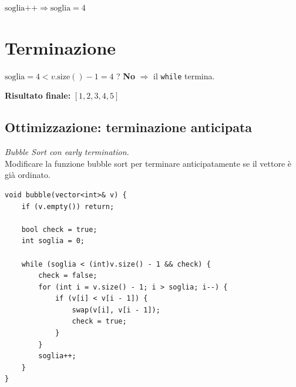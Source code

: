$\text{soglia++} \Rightarrow \text{soglia} = 4$
\begin{center}
\end{center}

\section*{Terminazione}

$\text{soglia} = 4 < v.\text{size}() - 1 = 4$ ? \quad \textbf{No} $\Rightarrow$ il \texttt{while} termina.

\bigskip
\textbf{Risultato finale:} $[1, 2, 3, 4, 5]$ \checkmark



\subsection{Ottimizzazione: terminazione anticipata}

\begin{problema}
\textit{Bubble Sort con early termination.}\\
Modificare la funzione bubble sort per terminare anticipatamente se il vettore è già ordinato.
\end{problema}


\begin{soluzione}
\begin{codeexample}
  \begin{codebox}
    \begin{lstlisting}
void bubble(vector<int>& v) {
    if (v.empty()) return;

    bool check = true;
    int soglia = 0;

    while (soglia < (int)v.size() - 1 && check) {
        check = false;
        for (int i = v.size() - 1; i > soglia; i--) {
            if (v[i] < v[i - 1]) {
                swap(v[i], v[i - 1]);
                check = true;
            }
        }
        soglia++;
    }
}
    \end{lstlisting}
  \end{codebox}
\end{codeexample}
\end{soluzione}


